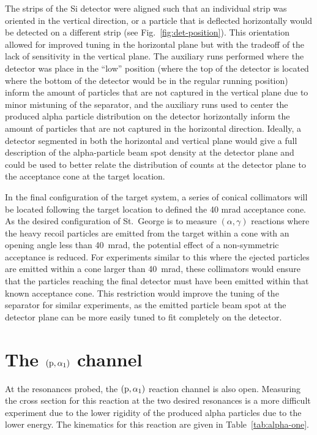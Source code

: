 The strips of the Si detector were aligned such that an individual strip
was oriented in the vertical direction, or a particle that is deflected
horizontally would be detected on a different strip (see
Fig.~\ref{fig:det-position}). This orientation allowed for
improved tuning in the horizontal plane but with the tradeoff of the
lack of sensitivity in the vertical plane. The auxiliary runs performed
where the detector was place in the ``low'' position (where the top of
the detector is located where the bottom of the detector would be in the
regular running position) inform the amount of particles that are not
captured in the vertical plane due to minor mistuning of the separator,
and the auxiliary runs used to center the produced alpha particle
distribution on the detector horizontally inform the amount of particles
that are not captured in the horizontal direction. Ideally, a detector
segmented in both the horizontal and vertical plane would give a full
description of the alpha-particle beam spot density at the detector
plane and could be used to better relate the distribution of counts at
the detector plane to the acceptance cone at the target location.

In the final configuration of the target system, a series of conical
collimators will be located following the target location to defined the
40 mrad acceptance cone. As the desired configuration of St.\ George is
to measure $(\alpha,\gamma)$ reactions where the heavy recoil particles
are emitted from the target within a cone with an opening angle less
than 40~mrad, the potential effect of a non-symmetric acceptance is
reduced. For experiments similar to this where the ejected particles are
emitted within a cone larger than 40~mrad, these collimators would
ensure that the particles reaching the final detector must have been
emitted within that known acceptance cone. This restriction would
improve the tuning of the separator for similar experiments, as the
emitted particle beam spot at the detector plane can be more easily
tuned to fit completely on the detector.


\section{The $({\rm p},\alpha_1)$ channel}
\label{sec:the-palpha_1-channel}

At the resonances probed, the $({\rm p},\alpha_1)$ reaction channel is
also open. Measuring the cross section for this reaction at the two
desired resonances is a more difficult experiment due to the lower
rigidity of the produced alpha particles due to the lower energy. The
kinematics for this reaction are given in Table~\ref{tab:alpha-one}.

